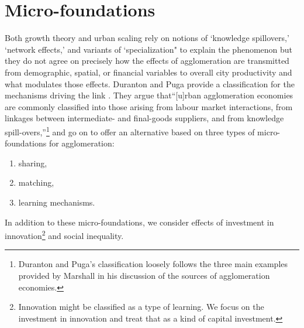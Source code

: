 \section{Micro-foundations} %


Both growth theory and urban scaling rely on %
notions of `knowledge spillovers,' `network effects,' and variants of `specialization" to explain the phenomenon but they do not agree on precisely how the effects of agglomeration are transmitted from demographic, spatial, or financial variables to overall city productivity and what modulates those effects. Duranton and Puga %
provide a classification for the mechanisms driving the link \cite{durantonMicroFoundationsUrbanAgglomeration2004}.  They argue that``[u]rban agglomeration economies are commonly classified into those arising from labour market interactions, from linkages between intermediate- and final-goods suppliers, and from knowledge spill-overs,''\footnote{Duranton and Puga's classification loosely follows the three main examples provided by Marshall \cite{marshallPrinciplesEconomics1890} in his discussion of the sources of agglomeration economies.} and go on to offer an alternative based on three types of micro-foundations for agglomeration:
\begin{enumerate}
\item sharing,
\item matching, 
\item learning mechanisms.
\end{enumerate}
In addition to these micro-foundations, we consider effects of investment in innovation\footnote{Innovation might be classified as a type of learning. We focus on the investment in innovation and treat that as a kind of capital investment.} and social inequality.

